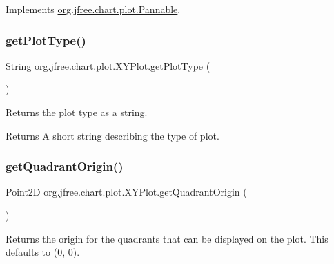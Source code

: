 Implements \mbox{\hyperlink{interfaceorg_1_1jfree_1_1chart_1_1plot_1_1_pannable_a09abf56f19f9173a9c1898ba03efdf8b}{org.\+jfree.\+chart.\+plot.\+Pannable}}.

\mbox{\label{classorg_1_1jfree_1_1chart_1_1plot_1_1_x_y_plot_ab22dc2addcd858fc304816629a8cdcdb}} 
\subsubsection{\texorpdfstring{get\+Plot\+Type()}{getPlotType()}}
{\footnotesize\ttfamily String org.\+jfree.\+chart.\+plot.\+X\+Y\+Plot.\+get\+Plot\+Type (\begin{DoxyParamCaption}{ }\end{DoxyParamCaption})}

Returns the plot type as a string.

\begin{DoxyReturn}{Returns}
A short string describing the type of plot. 
\end{DoxyReturn}
\mbox{\label{classorg_1_1jfree_1_1chart_1_1plot_1_1_x_y_plot_a618e05d8ad1e56930231dd6a4de3661c}} 
\subsubsection{\texorpdfstring{get\+Quadrant\+Origin()}{getQuadrantOrigin()}}
{\footnotesize\ttfamily Point2D org.\+jfree.\+chart.\+plot.\+X\+Y\+Plot.\+get\+Quadrant\+Origin (\begin{DoxyParamCaption}{ }\end{DoxyParamCaption})}

Returns the origin for the quadrants that can be displayed on the plot. This defaults to (0, 0).

